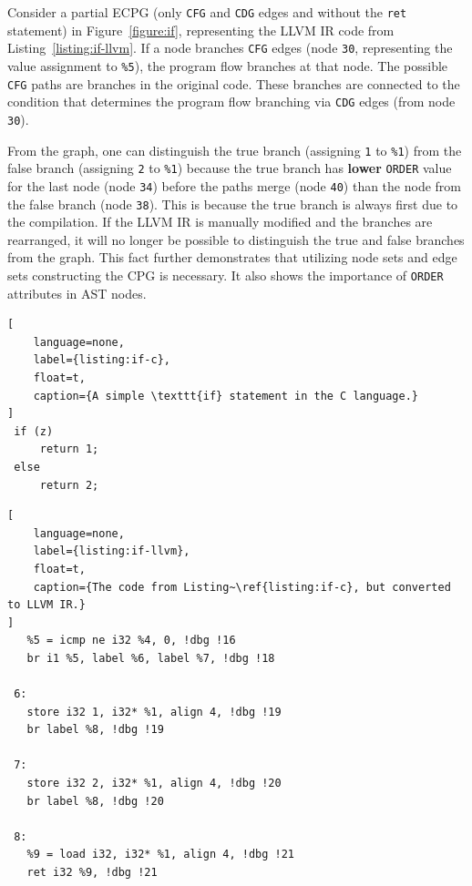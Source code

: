 Consider a partial ECPG (only \texttt{CFG} and \texttt{CDG} edges and without the \texttt{ret} statement) in Figure~\ref{figure:if}, representing the LLVM IR code from Listing~\ref{listing:if-llvm}. If a node branches \texttt{CFG} edges (node \texttt{30}, representing the value assignment to \texttt{\%5}), the program flow branches at that node. The possible \texttt{CFG} paths are branches in the original code. These branches are connected to the condition that determines the program flow branching via \texttt{CDG} edges (from node \texttt{30}). 

From the graph, one can distinguish the true branch (assigning \texttt{1} to \texttt{\%1}) from the false branch (assigning \texttt{2} to \texttt{\%1}) because the true branch has \textbf{lower} \texttt{ORDER} value for the last node (node \texttt{34}) before the paths merge (node \texttt{40}) than the node from the false branch (node \texttt{38}). This is because the true branch is always first due to the compilation. If the LLVM IR is manually modified and the branches are rearranged, it will no longer be possible to distinguish the true and false branches from the graph. This fact further demonstrates that utilizing node sets and edge sets constructing the CPG is necessary. It also shows the importance of \texttt{ORDER} attributes in AST nodes.



\begin{lstlisting}[
    language=none, 
    label={listing:if-c}, 
    float=t,
    caption={A simple \texttt{if} statement in the C language.}
]
 if (z)
     return 1;
 else
     return 2;
\end{lstlisting}

\begin{lstlisting}[
    language=none, 
    label={listing:if-llvm}, 
    float=t,
    caption={The code from Listing~\ref{listing:if-c}, but converted to LLVM IR.}
]
   %5 = icmp ne i32 %4, 0, !dbg !16
   br i1 %5, label %6, label %7, !dbg !18

 6:
   store i32 1, i32* %1, align 4, !dbg !19
   br label %8, !dbg !19

 7:
   store i32 2, i32* %1, align 4, !dbg !20
   br label %8, !dbg !20

 8:
   %9 = load i32, i32* %1, align 4, !dbg !21
   ret i32 %9, !dbg !21
\end{lstlisting}

